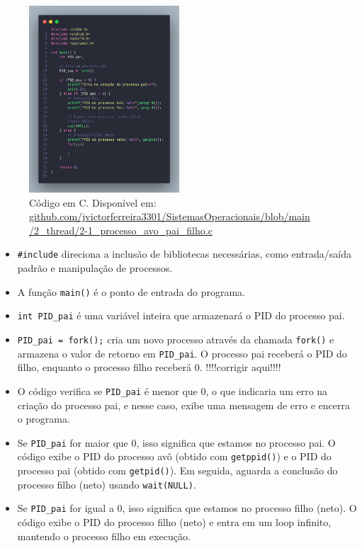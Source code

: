 \documentclass[
	12pt,				%
	openright,			%
	oneside,			%
	a4paper,			%
	chapter=TITLE,		%
	english,			%
	french,				%
	spanish,			%
	brazil				%
	]{abntex2}
\theoremstyle{definition}
\begin{document}
\begin{figure}
    \centering
    \includegraphics[width=0.5\textwidth]{imagens/processos_1.png}
	\caption{Código em C. Disponível em: \href{https://github.com/jvictorferreira3301/Sistemas_Operacionais/blob/main/2_thread/2-1_processo_avo_pai_filho.c}{github.com/jvictorferreira3301/SistemasOperacionais/blob/main
    /2\_thread/2-1\_processo\_avo\_pai\_filho.c}}
	\label{fig:processos1}
\end{figure}


\begin{itemize}
    \item \texttt{\#include} direciona a inclusão de bibliotecas necessárias, como entrada/saída padrão e manipulação de processos.
    \item A função \texttt{main()} é o ponto de entrada do programa.
    \item \texttt{int PID\_pai} é uma variável inteira que armazenará o PID do processo pai.
    \item \texttt{PID\_pai = fork();} cria um novo processo através da chamada \texttt{fork()} e armazena o valor de retorno em \texttt{PID\_pai}. O processo pai receberá o PID do filho, enquanto o processo filho receberá 0. !!!!corrigir aqui!!!!
    \item O código verifica se \texttt{PID\_pai} é menor que 0, o que indicaria um erro na criação do processo pai, e nesse caso, exibe uma mensagem de erro e encerra o programa.
    \item Se \texttt{PID\_pai} for maior que 0, isso significa que estamos no processo pai. O código exibe o PID do processo avô (obtido com \texttt{getppid()}) e o PID do processo pai (obtido com \texttt{getpid()}). Em seguida, aguarda a conclusão do processo filho (neto) usando \texttt{wait(NULL)}.
    \item Se \texttt{PID\_pai} for igual a 0, isso significa que estamos no processo filho (neto). O código exibe o PID do processo filho (neto) e entra em um loop infinito, mantendo o processo filho em execução.
\end{itemize}
\end{document}

